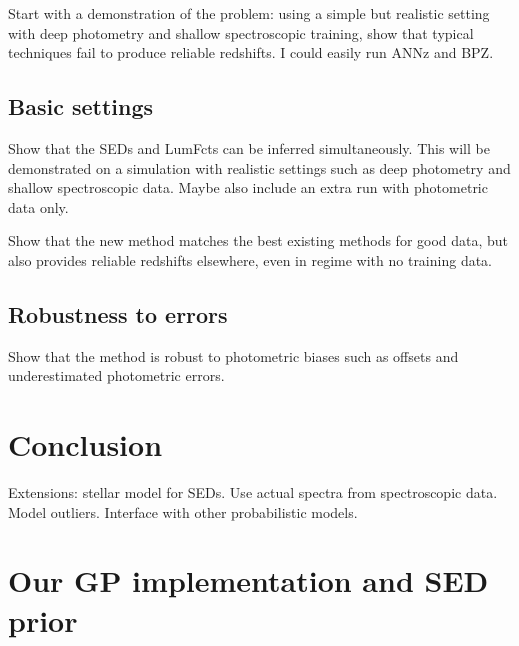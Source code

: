 \documentclass[aps,prd,showpacs,superscriptaddress,groupedaddress]{revtex4}  %
\begin{document}
Start with a demonstration of the problem: using a simple but realistic setting with deep photometry and shallow spectroscopic training, show that typical techniques fail to produce reliable redshifts. I could easily run ANNz and BPZ.


\subsection{Basic settings}

Show that the SEDs and LumFcts can be inferred simultaneously. This will be demonstrated on a simulation with realistic settings such as deep photometry and shallow spectroscopic data. Maybe also include an extra run with photometric data only. 

Show that the new method matches the best existing methods for good data, but also provides reliable redshifts elsewhere, even in regime with no training data. 

\subsection{Robustness to errors}

Show that the method is robust to photometric biases such as offsets and underestimated photometric errors. 



\section{Conclusion}
Extensions: stellar model for SEDs. Use actual spectra from spectroscopic data. Model outliers. Interface with other probabilistic models.


\footnotesize{
  
\providecommand{\eprint}[1]{\href{http://arxiv.org/abs/#1}{arXiv:#1}}	
  
}
\normalsize


\appendix
\section{Our GP implementation and SED prior}
\end{document}
